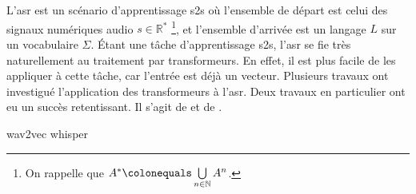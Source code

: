 \section{}
\label{sec.asr}

L'\gls{asr} est un scénario d'apprentissage \gls{s2s} où 
l'ensemble de départ est celui des signaux numériques audio \(s\in\mathbb{R}^\ast\)%
\footnote{%
   On rappelle que \(A^\ast \colonequals \bigcup\limits_{n\in\mathbb{N}} A^n\).
}, %
et l'ensemble d'arrivée est un langage \(L\) sur un vocabulaire \(\Sigma\).
Étant une tâche d'apprentissage \gls{s2s}, l'\gls{asr} se fie très naturellement au traitement par transformeurs.
En effet, il est plus facile de les appliquer à cette tâche, car l'entrée est déjà un vecteur.
Plusieurs travaux ont investigué l'application des transformeurs à l'\gls{asr}.
Deux travaux en particulier ont eu un succès retentissant.
Il s'agit de \cite{Schneider_Baevski_Collobert_Auli_2019} 
et de \cite{Radford_Kim_Xu_Brockman_McLeavey_Sutskever_2022}.

{wav2vec}
{whisper}